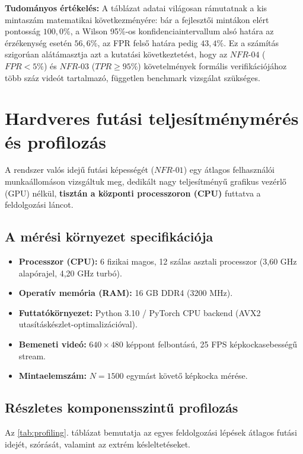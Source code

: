 \documentclass[12pt,a4paper,oneside]{report}
\begin{document}
\textbf{Tudományos értékelés:} A táblázat adatai világosan rámutatnak a kis mintaszám matematikai következményére: bár a fejlesztői mintákon elért pontosság $100{,}0\%$, a Wilson 95\%-os konfidenciaintervallum alsó határa az érzékenység esetén $56{,}6\%$, az FPR felső határa pedig $43{,}4\%$. Ez a számítás szigorúan alátámasztja azt a kutatási következtetést, hogy az $NFR\text{-}04$ ($FPR < 5\%$) és $NFR\text{-}03$ ($TPR \ge 95\%$) követelmények formális verifikációjához több száz videót tartalmazó, független benchmark vizsgálat szükséges.

\section{Hardveres futási teljesítménymérés és profilozás}
A rendszer valós idejű futási képességét ($NFR\text{-}01$) egy átlagos felhasználói munkaállomáson vizsgáltuk meg, dedikált nagy teljesítményű grafikus vezérlő (GPU) nélkül, \textbf{tisztán a központi processzoron (CPU)} futtatva a feldolgozási láncot.

\subsection{A mérési környezet specifikációja}
\begin{itemize}
    \item \textbf{Processzor (CPU):} 6 fizikai magos, 12 szálas asztali processzor (3,60 GHz alapórajel, 4,20 GHz turbó).
    \item \textbf{Operatív memória (RAM):} 16 GB DDR4 (3200 MHz).
    \item \textbf{Futtatókörnyezet:} Python 3.10 / PyTorch CPU backend (AVX2 utasításkészlet-optimalizációval).
    \item \textbf{Bemeneti videó:} $640 \times 480$ képpont felbontású, 25 FPS képkockasebességű stream.
    \item \textbf{Mintaelemszám:} $N = 1500$ egymást követő képkocka mérése.
\end{itemize}

\subsection{Részletes komponensszintű profilozás}
Az \ref{tab:profiling}. táblázat bemutatja az egyes feldolgozási lépések átlagos futási idejét, szórását, valamint az extrém késleltetéseket.
\end{document}

